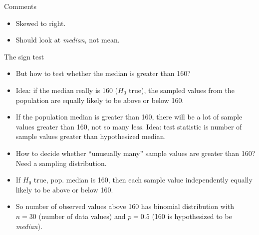 \documentclass[
  ignorenonframetext,
]{beamer}
\providecommand{\tightlist}{%
  \setlength{\itemsep}{0pt}\setlength{\parskip}{0pt}}
\begin{document}
\begin{frame}{Comments}
\protect\hypertarget{comments-5}{}

\begin{itemize}
\tightlist
\item
  Skewed to right.
\item
  Should look at \emph{median}, not mean.
\end{itemize}

\end{frame}

\begin{frame}{The sign test}
\protect\hypertarget{the-sign-test}{}

\begin{itemize}
\tightlist
\item
  But how to test whether the median is greater than 160?
\item
  Idea: if the median really is 160 (\(H_0\) true), the sampled values
  from the population are equally likely to be above or below 160.
\item
  If the population median is greater than 160, there will be a lot of
  sample values greater than 160, not so many less. Idea: test statistic
  is number of sample values greater than hypothesized median.
\item
  How to decide whether ``unusually many'' sample values are greater
  than 160? Need a sampling distribution.
\item
  If \(H_0\) true, pop. median is 160, then each sample value
  independently equally likely to be above or below 160.
\item
  So number of observed values above 160 has binomial distribution with
  \(n = 30\) (number of data values) and \(p = 0.5\) (160 is
  hypothesized to be \emph{median}).
\end{itemize}

\end{frame}
\end{document}
